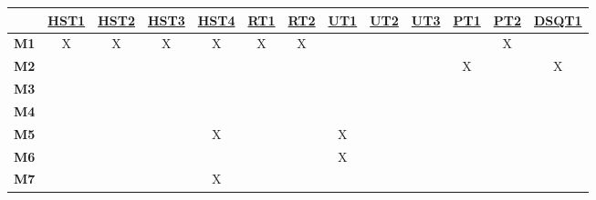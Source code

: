 \documentclass[12pt, titlepage]{article}
\begin{document}
\begin{table}[H]
  \centering
  \begin{tabular}{|c|c|c|c|c|c|c|c|c|c|c|c|c|}
    \hline
                 & \hyperref[HST1]{HST1} & \hyperref[HST2]{HST2} & \hyperref[HST3]{HST3} & \hyperref[HST4]{HST4} & \hyperref[RT1]{RT1} & \hyperref[RT2]{RT2} & \hyperref[UT1]{UT1} & \hyperref[UT2]{UT2} & \hyperref[UT3]{UT3} & \hyperref[PT1]{PT1} & \hyperref[PT2]{PT2} & \hyperref[DSQT1]{DSQT1} \\
    \hline
    \textbf{M1}  & X                     & X                     & X                     & X                     & X                   & X                   &                     &                     &                     &                     & X                   &                         \\ \hline
    \textbf{M2}  &                       &                       &                       &                       &                     &                     &                     &                     &                     & X                   &                     & X                       \\ \hline
    \textbf{M3}  &                       &                       &                       &                       &                     &                     &                     &                     &                     &                     &                     &                         \\ \hline
    \textbf{M4}  &                       &                       &                       &                       &                     &                     &                     &                     &                     &                     &                     &                         \\ \hline
    \textbf{M5}  &                       &                       &                       & X                     &                     &                     & X                   &                     &                     &                     &                     &                         \\ \hline
    \textbf{M6}  &                       &                       &                       &                       &                     &                     & X                   &                     &                     &                     &                     &                         \\ \hline
    \textbf{M7}  &                       &                       &                       & X                     &                     &                     &                     &                     &                     &                     &                     &                         \\ \hline

\end{tabular}
\end{table}
\end{document}
